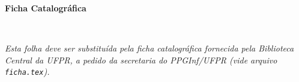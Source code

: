 %

\begin{ficha}	%

\begin{center}
\textbf{Ficha Catalográfica}

~

\emph{Esta folha deve ser substituída pela ficha catalográfica fornecida pela Biblioteca Central da UFPR, a pedido da secretaria do PPGInf/UFPR (vide arquivo \texttt{ficha.tex}).}
\end{center}

%

\end{ficha}

